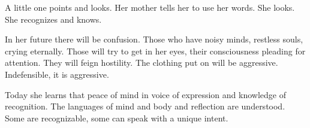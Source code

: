 

﻿A little one points and looks.  Her mother tells her to use her words.
She looks.  She recognizes and knows.

In her future there will be confusion.  Those who have noisy minds,
restless souls, crying eternally.  Those will try to get in her eyes,
their consciousness pleading for attention.  They will feign
hostility.  The clothing put on will be aggressive.  Indefensible, it
is aggressive.

Today she learns that peace of mind in voice of expression and
knowledge of recognition.  The languages of mind and body and
reflection are understood.  Some are recognizable, some can speak with
a unique intent.

\bye
